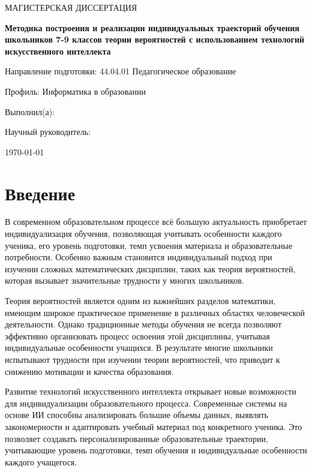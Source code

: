 \documentclass[a4paper,14pt]{extreport}
\begin{document}
\begin{titlepage}
    \centering
    \vspace*{1cm}
    {\Large МАГИСТЕРСКАЯ ДИССЕРТАЦИЯ\par}
    \vspace{1.5cm}
    {\LARGE\bfseries Методика построения и реализации индивидуальных траекторий обучения школьников 7-9 классов теории вероятностей с использованием технологий искусственного интеллекта\par}
    \vspace{3cm}
    {\Large Направление подготовки: 44.04.01 Педагогическое образование\par}
    \vspace{0.5cm}
    {\Large Профиль: Информатика в образовании\par}
    \vfill
    {\large Выполнил(а): \par}
    {\large Научный руководитель: \par}
    \vspace{1cm}
    {\large \today\par}
\end{titlepage}

\tableofcontents
\newpage

\chapter*{Введение}

В современном образовательном процессе всё большую актуальность приобретает индивидуализация обучения, позволяющая учитывать особенности каждого ученика, его уровень подготовки, темп усвоения материала и образовательные потребности. Особенно важным становится индивидуальный подход при изучении сложных математических дисциплин, таких как теория вероятностей, которая вызывает значительные трудности у многих школьников.

Теория вероятностей является одним из важнейших разделов математики, имеющим широкое практическое применение в различных областях человеческой деятельности. Однако традиционные методы обучения не всегда позволяют эффективно организовать процесс освоения этой дисциплины, учитывая индивидуальные особенности учащихся. В результате многие школьники испытывают трудности при изучении теории вероятностей, что приводит к снижению мотивации и качества образования.

Развитие технологий искусственного интеллекта открывает новые возможности для индивидуализации образовательного процесса. Современные системы на основе ИИ способны анализировать большие объемы данных, выявлять закономерности и адаптировать учебный материал под конкретного ученика. Это позволяет создавать персонализированные образовательные траектории, учитывающие уровень подготовки, темп обучения и индивидуальные особенности каждого учащегося.
\end{document}
